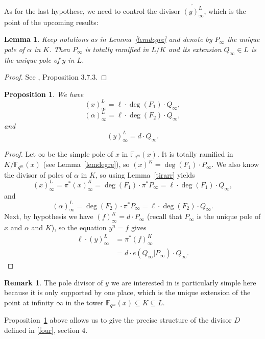 \documentclass[10pt]{article}
\newtheorem{prop1}[thm]{Proposition}
\newtheorem{lem1}[thm]{Lemma}
\theoremstyle{definition}
\newtheorem{rq1}[thm]{Remark}
\theoremstyle{definition}
\theoremstyle{definition}
\newcommand{\cd}{\cdot}
\newcommand{\Fqm}{\mathbb{F}_{q^m}}
\newcommand{\su}{\subseteq}
\begin{document}
As for the last hypothese, we need to control the divisor $\widetilde{(y)^L_{\infty}}$, which is the point of the upcoming results: 

\begin{lem1} \label{ramification}
Keep notations as in Lemma~\ref{lemdegre} and denote by $P_{\infty}$ the unique pole of $\alpha$ in $K$. Then $P_{\infty}$ is totally ramified in $L/K$ and its extension $Q_{\infty} \in L$ is the unique pole of $y$ in $L$. 
\end{lem1}

\begin{proof}
See \cite{Sti}, Proposition 3.7.3.
\end{proof}

\begin{prop1} \label{propcle}
We have
\[(x)^L_{\infty} = \ell \cd \deg(F_1) \cd Q_{\infty},\]
\[(\alpha)^L_{\infty} = \ell \cd \deg(F_2) \cd Q_{\infty},\]
and
\[(y)^L_{\infty} = d \cd Q_{\infty}.\]
\end{prop1}

\begin{proof}
Let $\infty$ be the simple pole of $x$ in $\Fqm(x)$. It is totally ramified in $K/\Fqm(x)$ (see Lemma~\ref{lemdegre}), so $(x)^K = \deg(F_1) \cd P_{\infty}$. We also know the divisor of poles of $\alpha$ in $K$, so using Lemma~\ref{tirarr} yields
\[(x)^L_{\infty} = \pi^*(x)^K_{\infty} = \deg(F_1) \cd \pi^*P_{\infty} = \ell \cd \deg(F_1) \cd Q_{\infty},\]
and
\[(\alpha)^L_{\infty} = \deg(F_2) \cd \pi^*P_{\infty} = \ell \cd \deg(F_2) \cd Q_{\infty}.\]
Next, by hypothesis we have $(f)^K_{\infty} = d \cd P_{\infty}$ (recall that $P_{\infty}$ is the unique pole of $x$ and $\alpha$ and $K$), so the equation $y^n=f$ gives
\begin{align*} \ell \cd (y)^L_{\infty} &= \pi^*(f)^K_{\infty} \\
&= d \cd e(Q_{\infty}|P_{\infty}) \cd Q_{\infty}.
\end{align*}
\end{proof}

\begin{rq1} The pole divisor of $y$ we are interested in is particularly simple here because it is only supported by one place, which is the unique extension of the point at infinity $\infty$ in the tower $\Fqm(x) \su K \su L$.
\end{rq1}

Proposition~\ref{propcle} above allows us to give the precise structure of the divisor $D$ defined in \eqref{four}, section 4.
\end{document}
